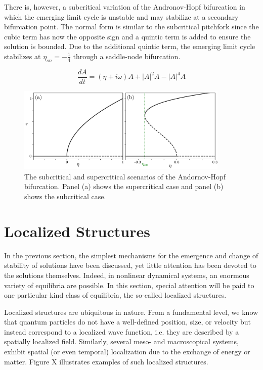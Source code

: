 There is, however, a subcritical variation
of the Andronov-Hopf bifurcation in which the emerging limit cycle is unstable and may stabilize at a secondary bifurcation point.
The normal form is similar to the subcritical pitchfork since the cubic term has now the opposite sign and a quintic term is added to ensure the solution is bounded.
Due to the additional quintic term, the emerging limit cycle stabilizes at $\eta_{sn} = -\frac14$ through
a saddle-node bifurcation.

\begin{equation}
    \dfrac{dA}{dt} = (\eta + i\omega) A + |A|^2 A - |A|^4A
\end{equation}

\begin{figure}[h]
    \centering
    \includegraphics[width=0.9\textwidth]{imagenes/framework/hopf_supersub.pdf}
    \caption{The subcritical and supercritical scenarios of the Andornov-Hopf
    bifurcation. Panel (a) shows the supercritical case and panel (b) shows the subcritical
    case.}
\end{figure}

\section{Localized Structures}
\label{sec:fra_LS}

In the previous section, the simplest mechanisms for the emergence and
change of stability of solutions have been discussed, yet little attention
has been devoted to the solutions themselves. Indeed, in nonlinear dynamical
systems, an enormous variety of equilibria are possible. In this section,
special attention will be paid to one particular kind class of equilibria,
the so-called localized structures. 

Localized structures are ubiquitous in nature. From a fundamental level,
we know that quantum particles do not have a well-defined position, size,
or velocity but instead correspond to a localized wave function, i.e. 
they are described by a spatially localized field. Similarly,
several meso- and macroscopical systems, 
exhibit spatial (or even temporal) localization due to the exchange
of energy or matter. Figure X illustrates 
examples of such localized structures.

